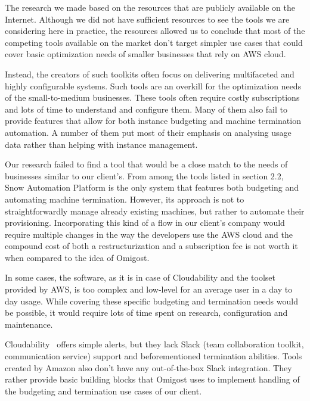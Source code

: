 \documentclass[licencjacka,en]{thesisclass}
\begin{document}
    The research we made based on the resources that
    are publicly available on the Internet.
    Although we did not have sufficient resources to see
    the tools we are considering here in practice,
    the resources allowed us to conclude that most of the competing tools
    available on the market don't target simpler use cases that could
    cover basic optimization needs of smaller businesses
    that rely on AWS cloud.

    Instead, the creators of such toolkits often
    focus on delivering multifaceted and highly configurable systems.
    Such tools are an overkill for the optimization needs of the small-to-medium
    businesses.
    These tools often require costly subscriptions and lots of time
    to understand and configure them.
    Many of them also fail to provide features
    that allow for both instance budgeting and machine termination automation.
    A number of them put most of their emphasis on analysing
    usage data rather than helping with instance management.

    Our research failed to find a tool that would be a close match to the needs
    of businesses similar to our client's.
    From among the tools listed in section 2.2, Snow Automation Platform
    is the only system that features both budgeting and automating
    machine termination.
    However, its approach is not to straightforwardly manage
    already existing machines,
    but rather to automate their provisioning.
    Incorporating this kind of a flow in our client's company would
    require multiple changes in the way the developers use the AWS cloud
    and the compound cost of both a restructurization and
    a subscription fee is not worth it when compared to the idea of Omigost.

    In some cases, the software, as it is in case of Cloudability
    and the toolset provided by AWS, is too complex and low-level
    for an average user in a day to day usage.
    While covering these specific budgeting and termination needs
    would be possible, it would require lots of time spent
    on research, configuration and maintenance.

    Cloudability~\cite{CloudabilityAlerts} offers simple alerts, but they lack
    Slack (team collaboration toolkit, communication service) support
    and beforementioned termination abilities.
    Tools created by Amazon also don't have any out-of-the-box
    Slack integration.
    They rather provide basic building blocks that Omigost uses
    to implement handling of the budgeting and termination
    use cases of our client.
\end{document}
